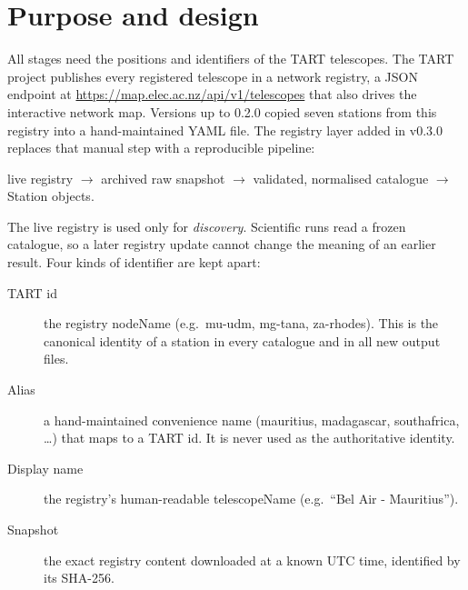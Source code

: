 \documentclass[11pt,a4paper]{article}
\newcommand{\code}[1]{{\ttfamily\def\_{\textunderscore\allowbreak}#1}}
\begin{document}
\section{Purpose and design}
\label{sec:registry}

All stages need the positions and identifiers of the TART telescopes. The
TART project publishes every registered telescope in a network registry, a
JSON endpoint at \url{https://map.elec.ac.nz/api/v1/telescopes} that also
drives the interactive network map. Versions up to 0.2.0 copied seven
stations from this registry into a hand-maintained YAML file. The registry
layer added in v0.3.0 replaces that manual step with a reproducible
pipeline:
\begin{center}
live registry $\rightarrow$ archived raw snapshot $\rightarrow$ validated,
normalised catalogue $\rightarrow$ \code{Station} objects.
\end{center}
The live registry is used only for \emph{discovery}. Scientific runs read a
frozen catalogue, so a later registry update cannot change the meaning of an
earlier result. Four kinds of identifier are kept apart:
\begin{description}
\item[TART id] the registry \code{nodeName} (e.g.\ \code{mu-udm},
\code{mg-tana}, \code{za-rhodes}). This is the canonical identity of a
station in every catalogue and in all new output files.
\item[Alias] a hand-maintained convenience name (\code{mauritius},
\code{madagascar}, \code{south\_africa}, \dots) that maps to a TART id. It
is never used as the authoritative identity.
\item[Display name] the registry's human-readable \code{telescopeName}
(e.g.\ ``Bel Air - Mauritius'').
\item[Snapshot] the exact registry content downloaded at a known UTC time,
identified by its SHA-256.
\end{description}
\end{document}
